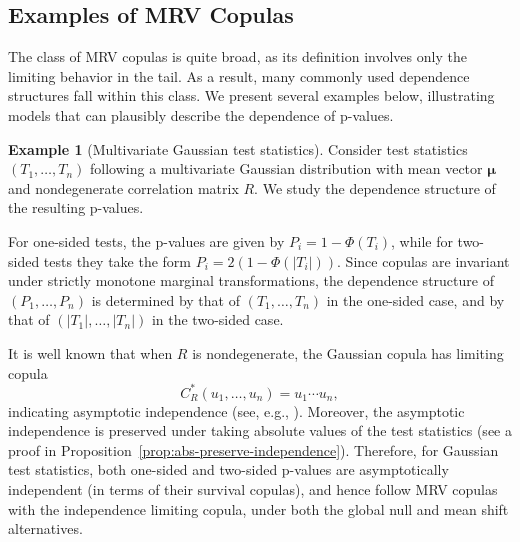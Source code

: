 \documentclass[12pt]{article}
\theoremstyle{plain}
\theoremstyle{plain}
\theoremstyle{definition}
\newtheorem{exmp}{Example}[section]
\begin{document}
\subsection{Examples of MRV Copulas}
\label{subsec:mrv-copula-examples}
The class of MRV copulas is quite broad, as its definition involves only the limiting behavior in the tail. As a result, many commonly used dependence structures fall within this class. We present several examples below, illustrating models that can plausibly describe the dependence of p-values.

\begin{exmp}[Multivariate Gaussian test statistics]
Consider test statistics $(T_1,\dots,T_n)$ following a multivariate Gaussian distribution with mean vector $\bm\mu$ and nondegenerate correlation matrix $R$. We study the dependence structure of the resulting p-values. 

For one-sided tests, the p-values are given by $P_i = 1 - \Phi(T_i)$, while for two-sided tests they take the form $P_i = 2(1 - \Phi(|T_i|))$. Since copulas are invariant under strictly monotone marginal transformations, the dependence structure of $(P_1,\dots,P_n)$ is determined by that of $(T_1,\dots,T_n)$ in the one-sided case, and by that of $(|T_1|,\dots,|T_n|)$ in the two-sided case.

It is well known that when $R$ is nondegenerate, the Gaussian copula has limiting copula
\[
C_R^*(u_1,\dots,u_n)=u_1\cdots u_n,
\]
indicating asymptotic independence (see, e.g., \cite{mcneil2015quantitative}). Moreover, the asymptotic independence is preserved under taking absolute values of the test statistics (see a proof in Proposition~\ref{prop:abs-preserve-independence}). Therefore, for Gaussian test statistics, both one-sided and two-sided p-values are asymptotically independent (in terms of their survival copulas), and hence follow MRV copulas with the independence limiting copula,  under both the global null and mean shift alternatives. 
\end{exmp}
\end{document}
